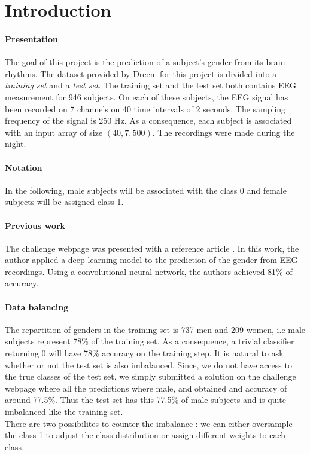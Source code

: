 \section{Introduction}

\paragraph{Presentation}The goal of this project is the prediction of a subject's gender from its brain rhythms.
The dataset provided by Dreem for this project is divided into a \textit{training set} and a \textit{test set}. The training set and the test set both contains EEG measurement for 946 subjects. On each of these subjects, the EEG signal has been recorded on 7 channels on 40 time intervals of 2 seconds. The sampling frequency of the signal is 250 Hz. As a consequence, each subject is associated with an input array of size $(40, 7, 500)$. The recordings were made during the night.
\paragraph{Notation} In the following, male subjects will be associated with the class 0 and female subjects will be assigned class 1.

\paragraph{Previous work}

The challenge webpage was presented with a reference article \cite{nature_original}. In this work, the author applied a deep-learning model to the prediction of the gender from EEG recordings. Using a convolutional neural network, the authors achieved 81\% of accuracy. 

\paragraph{Data balancing} The repartition of genders in the training set is 737 men and 209 women, i.e male subjects represent 78\% of the training set. As a consequence, a trivial classifier returning 0 will have 78\% accuracy on the training step. It is natural to ask whether or not the test set is also imbalanced. Since, we do not have access to the true classes of the test set, we simply submitted a solution on the challenge webpage where all the predictions where male, and obtained and accuracy of around 77.5\%. Thus the test set has this 77.5\% of male subjects and is quite imbalanced like the training set. \\
There are two possibilites to counter the imbalance : we can either oversample the class 1 to adjust the class distribution or assign different weights to each class.